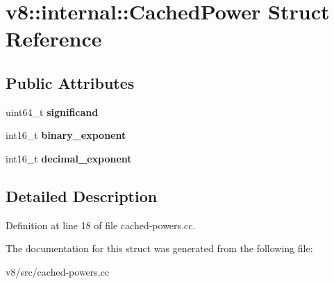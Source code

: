 \hypertarget{structv8_1_1internal_1_1CachedPower}{}\section{v8\+:\+:internal\+:\+:Cached\+Power Struct Reference}
\label{structv8_1_1internal_1_1CachedPower}
\subsection*{Public Attributes}
\begin{DoxyCompactItemize}
\item 
\mbox{\label{structv8_1_1internal_1_1CachedPower_a36c4e942b0d8b3c5b7905d31781f5622}} 
uint64\+\_\+t {\bfseries significand}
\item 
\mbox{\label{structv8_1_1internal_1_1CachedPower_a6259fc585c893b3372cbc393de4d73ad}} 
int16\+\_\+t {\bfseries binary\+\_\+exponent}
\item 
\mbox{\label{structv8_1_1internal_1_1CachedPower_af8c120ffc417e47e2cc809b8beea2c6f}} 
int16\+\_\+t {\bfseries decimal\+\_\+exponent}
\end{DoxyCompactItemize}


\subsection{Detailed Description}


Definition at line 18 of file cached-\/powers.\+cc.



The documentation for this struct was generated from the following file\+:\begin{DoxyCompactItemize}
\item 
v8/src/cached-\/powers.\+cc\end{DoxyCompactItemize}
